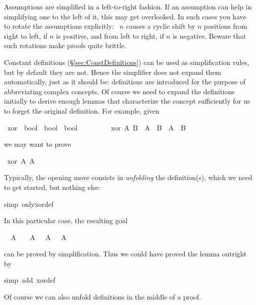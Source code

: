 \begin{isabellebody}
\begin{isamarkuptext}
\begin{warn}
Assumptions are simplified in a left-to-right fashion. If an
assumption can help in simplifying one to the left of it, this may get
overlooked. In such cases you have to rotate the assumptions explicitly:
~$n$\isa{{\isacharparenright}}
causes a cyclic shift by $n$ positions from right to left, if $n$ is
positive, and from left to right, if $n$ is negative.
Beware that such rotations make proofs quite brittle.
\end{warn}%
\end{isamarkuptext}%
%
%
\begin{isamarkuptext}%
Constant definitions (\S\ref{sec:ConstDefinitions}) can
be used as simplification rules, but by default they are not.  Hence the
simplifier does not expand them automatically, just as it should be:
definitions are introduced for the purpose of abbreviating complex
concepts. Of course we need to expand the definitions initially to derive
enough lemmas that characterize the concept sufficiently for us to forget the
original definition. For example, given%
\end{isamarkuptext}%
\ xor\ {\isacharcolon}{\isacharcolon}\ {\isachardoublequote}bool\ {\isasymRightarrow}\ bool\ {\isasymRightarrow}\ bool{\isachardoublequote}\isanewline
\ \ \ \ \ \ \ \ \ {\isachardoublequote}xor\ A\ B\ {\isasymequiv}\ {\isacharparenleft}A\ {\isasymand}\ {\isasymnot}B{\isacharparenright}\ {\isasymor}\ {\isacharparenleft}{\isasymnot}A\ {\isasymand}\ B{\isacharparenright}{\isachardoublequote}%
\begin{isamarkuptext}%
\noindent
we may want to prove%
\end{isamarkuptext}%
\ {\isachardoublequote}xor\ A\ {\isacharparenleft}{\isasymnot}A{\isacharparenright}{\isachardoublequote}%
\begin{isamarkuptxt}%
\noindent
Typically, the opening move consists in \emph{unfolding} the definition(s), which we need to
get started, but nothing else:%
\end{isamarkuptxt}%
simp\ only{\isacharcolon}xor{\isacharunderscore}def{\isacharparenright}%
\begin{isamarkuptxt}%
\noindent
In this particular case, the resulting goal
\begin{isabelle}%
\ {}{\isachardot}\ A\ {\isasymand}\ {\isasymnot}\ {\isasymnot}\ A\ {\isasymor}\ {\isasymnot}\ A\ {\isasymand}\ {\isasymnot}\ A%
\end{isabelle}
can be proved by simplification. Thus we could have proved the lemma outright by%
\end{isamarkuptxt}%
simp\ add{\isacharcolon}\ xor{\isacharunderscore}def{\isacharparenright}%
\begin{isamarkuptext}%
\noindent
Of course we can also unfold definitions in the middle of a proof.


\end{isamarkuptext}
\end{isabellebody}
